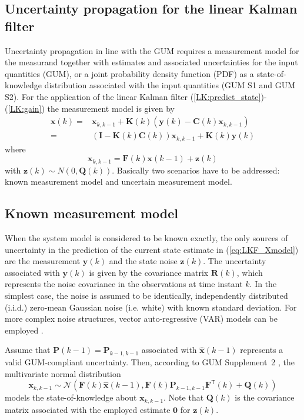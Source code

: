 \documentclass[10pt]{article}
\begin{document}
\begin{spacing}{1}
\section{Uncertainty propagation for the linear Kalman filter}
\label{sec:LKF}
Uncertainty propagation in line with the GUM requires a measurement model for the measurand together with estimates and associated uncertainties for the input quantities (GUM), or a joint probability density function (PDF) as a state-of-knowledge distribution associated with the input quantities (GUM S1 and GUM S2). For the application of the linear Kalman filter (\ref{LK:predict_state})-(\ref{LK:gain}) the measurement model is given by
\begin{align}
	\bm{x}(k) =& \bm{x}_{k,k-1} + \bm{K}(k)(\bm{y}(k)-\bm{C}(k)\bm{x}_{k,k-1}) \\
	          =& (\bm{I} - \bm{K}(k)\bm{C}(k))\bm{x}_{k,k-1} + \bm{K}(k)\bm{y}(k) \label{eq:LKF_Xmodel}
\end{align}
where
\[ \bm{x}_{k,k-1} = \bm{F}(k)\bm{x}(k-1) + \bm{z}(k) \]
with $\bm{z}(k)\sim N(0,\bm{Q}(k))$. Basically two scenarios have to be addressed: known measurement model and uncertain measurement model. 




\subsection{Known measurement model}
\label{sec:LKF_knownmodel}
When the system model is considered to be known exactly, the only sources of uncertainty 
in the prediction of the current state estimate in (\ref{eq:LKF_Xmodel}) are the measurement $\bm{y}(k)$ and the state noise $\bm{z}(k)$. The uncertainty associated with $\bm{y}(k)$ is given by the covariance matrix $\bm{R}(k)$, which represents the noise covariance in the observations at time instant $k$. In the simplest case, the noise is assumed to be identically, independently distributed (i.i.d.) zero-mean Gaussian noise (i.e. white) with known standard deviation. For more complex noise structures, vector auto-regressive (VAR) models can be employed \cite{Reinsel:1992ki}. 

Assume that $\bm{P}(k-1)=\bm{P}_{k-1,k-1}$ associated with $\hat{\bm{x}}(k-1)$ represents a valid GUM-compliant uncertainty. Then, according to GUM Supplement~2 \cite{GUMS2}, the multivariate normal distribution 
\[\bm{x}_{k,k-1} \sim\mathcal{N} \left( \bm{F}(k)\hat{\bm{x}}(k-1), \bm{F}(k)\bm{P}_{k-1,k-1}\bm{F}^{\mathsf{T}}(k) + \bm{Q}(k) \right)\]
models the state-of-knowledge about $\bm{x}_{k,k-1}$. 
Note that $\bm{Q}(k)$ is the covariance matrix associated with the employed estimate $\bm{0}$ for $\bm{z}(k)$.


\end{spacing}
\end{document}
